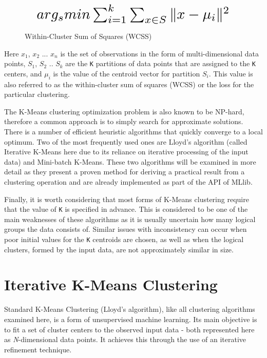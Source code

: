 \documentclass{l4proj}
\begin{document}
\begin{figure}[H]
\label{wcss}
\[ \scalebox{2}{$ arg_{s} min \sum_{i=1}^{k}\sum_{x \in S} \|x - \mu_{i} \|^{2} $} \]
\caption{Within-Cluster Sum of Squares (WCSS)}
\end{figure}

Here $x_{1}$, $x_{2}$ ... $x_{n}$ is the set of observations in the form of multi-dimensional data points, $S_{1}$, $S_{2}$ .. $S_{k}$ are the \texttt{K} partitions of data points that are assigned to the \texttt{K} centers, and $\mu_{i}$ is the value of the centroid vector for partition $S_{i}$. This value is also referred to as the within-cluster sum of squares (WCSS) or the loss for the particular clustering\cite{MLIntro}.

The K-Means clustering optimization problem is also known to be NP-hard, therefore  a common approach is to simply search for approximate solutions. There is a number of efficient heuristic algorithms that quickly converge to a local optimum. Two of the most frequently used ones are Lloyd's algorithm (called Iterative K-Means here due to its reliance on iterative processing of the input data) and Mini-batch K-Means. These two algorithms will be examined in more detail as they present a proven method for deriving a practical result from a clustering operation and are already implemented as part of the API of MLlib.

Finally, it is worth considering that most forms of K-Means clustering require that the value of \texttt{K} is specified in advance. This is considered to be one of the main weaknesses of these algorithms as it is usually uncertain how many logical groups the data consists of. Similar issues with inconsistency can occur when poor initial values for the \texttt{K} centroids are chosen, as well as when the logical clusters, formed by the input data, are not approximately similar in size.

\section{Iterative K-Means Clustering}

Standard K-Means Clustering (Lloyd's algorithm), like all clustering algorithms examined here, is a form of unsupervised machine learning\cite{TopTen}. Its main  objective is to fit a set of cluster centers to the observed input data - both represented here as \textit{N}-dimensional data points. It achieves this through the use of an iterative refinement technique.
\end{document}

